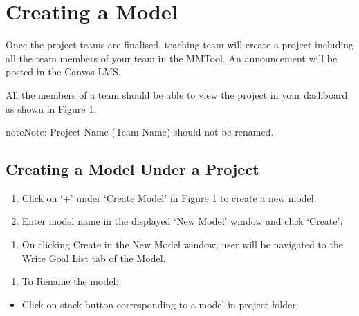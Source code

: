 \documentclass[letterpaper,10pt,english]{jupyterBook}
\begin{document}
\section{Creating a Model}
\label{\detokenize{appendices/appendix_b/motivational_model_guide:creating-a-model}}
\sphinxAtStartPar
Once the project teams are finalised, teaching team will create a
project including all the team members of your team in the MMTool. An
announcement will be posted in the Canvas LMS.

\sphinxAtStartPar
All the members of a team should be able to view the project in your
dashboard as shown in Figure 1.

\sphinxAtStartPar
{}

\begin{sphinxadmonition}{note}{Note:}
\sphinxAtStartPar
Project Name (Team Name) should not be renamed.
\end{sphinxadmonition}


\subsection{Creating a Model Under a Project}
\label{\detokenize{appendices/appendix_b/motivational_model_guide:creating-a-model-under-a-project}}\begin{enumerate}
%
\item {} 
\sphinxAtStartPar
Click on ‘+’ under ‘Create Model’ in Figure 1 to create a new model.

\item {} 
\sphinxAtStartPar
Enter model name in the displayed ‘New Model’ window and click
‘Create’:

\end{enumerate}

\sphinxAtStartPar
{}
\begin{enumerate}
%
\item {} 
\sphinxAtStartPar
On clicking Create in the New Model window, user will be navigated
to the Write Goal List tab of the Model.

\end{enumerate}

\sphinxAtStartPar
{}
\begin{enumerate}
%
\item {} 
\sphinxAtStartPar
To Rename the model:

\end{enumerate}
\begin{itemize}
\item {} 
\sphinxAtStartPar
Click on stack button corresponding to a model in project folder:

\end{itemize}
\end{document}
